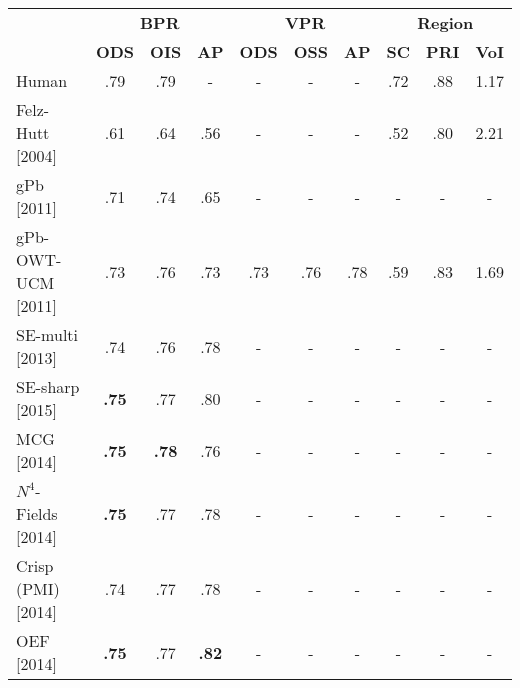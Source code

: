 \begin{table}[htbp]
\renewcommand{\arraystretch}{1.3}
\centering
\scriptsize
\begin{tabular}{l|c|c|c||c|c|c||c|c|c|}
\cline{2-10} %
\multirow{2}{*}{} & \multicolumn{3}{c||}{\textbf{BPR}} & \multicolumn{3}{c||}{\textbf{VPR}}& \multicolumn{3}{c|}{\textbf{Region}}\\
\cline{2-10}
& \textbf{ODS}  & \textbf{OIS} & \textbf{AP} %
& \textbf{ODS} & \textbf{OSS} & \textbf{AP} %
& \textbf{SC} & \textbf{PRI} & \textbf{VoI} \\
\hline
\multicolumn{1}{|l|}{Human} & .79 & .79 & - & - & - & - & .72 & .88 & 1.17 \\ %
\hline
\hline
\multicolumn{1}{|l|}{\cite{Felzenszwalb04} Felz-Hutt [2004]} & .61 & .64 & .56 & - & - & - & .52 & .80 & 2.21 \\ %
\hline
\multicolumn{1}{|l|}{\cite{Arbelaez11} gPb [2011]} & .71 & .74 & .65 & - & - & - & - & - & - \\ %
\hline
\multicolumn{1}{|l|}{\cite{Arbelaez11} gPb-OWT-UCM [2011]} & .73 & .76 & .73 & .73 & .76 & .78 & .59 & .83 & 1.69 \\ %
\hline
\multicolumn{1}{|l|}{\cite{DollarICCV13edges} SE-multi [2013]} & .74 & .76 & .78 & - & - & - & - & - & - \\ %
\hline
\multicolumn{1}{|l|}{\cite{Dollar2015PAMI} SE-sharp [2015]} & {\bf .75} & .77 & .80 & - & - & - & - & - & - \\ %
\hline
\multicolumn{1}{|l|}{\cite{Arbelaez2014multiscale} MCG [2014]} & {\bf .75} & {\bf .78} & .76 & - & - & - & - & - & - \\ %
\hline
\multicolumn{1}{|l|}{\cite{Ganin2014n4fields} {$N^4$}-{F}ields [2014]} & {\bf .75} & .77 & .78 & - & - & - & - & - & - \\ %
\hline
\multicolumn{1}{|l|}{\cite{Isola2014crisp} Crisp (PMI) [2014]} & .74 & .77 & .78 & - & - & - & - & - & - \\ %
\hline
\multicolumn{1}{|l|}{\cite{Hallman2014} OEF [2014]} & {\bf .75} & .77 & {\bf .82} & - & - & - & - & - & - \\ %

\end{tabular}
\end{table}
